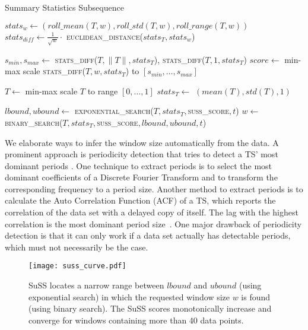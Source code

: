 \documentclass[pdflatex,sn-basic]{sn-jnl}
\begin{document}
\begin{algorithm}[t]
	\caption{Summary Statistics Subsequence}\label{alg:suss}
	\begin{algorithmic}[1]
			\State $stats_w \gets (roll\_mean(T, w), roll\_std(T, w), roll\_range(T,w))$
		    \State $stats_{diff} \gets \frac{1}{\sqrt{w}} \cdot $ \textsc{euclidean\_distance}($stats_T, stats_w$)
		    \State {}
		\EndProcedure
		
			\State $s_{min}, s_{max} \gets $ \textsc{stats\_diff($T, \|T\|, stats_T$)}, \textsc{stats\_diff($T, 1, stats_T$)}
			\State $score \gets $ min-max scale \textsc{stats\_diff($T, w, stats_T$)} to $[s_{min},\dots,s_{max}]$
			\State {}
		\EndProcedure
		
			\State $T \gets $ min-max scale $T$ to range $[0,\dots,1]$
			\State $stats_T  \gets $ $(mean(T), std(T), 1)$
			
			\State $lbound, ubound \gets $ \textsc{exponential\_search($T, stats_T,$\textsc{suss\_score}$,t$)}
			\State $w \gets $ \textsc{binary\_search}($T, stats_T,$\textsc{suss\_score}$,lbound, ubound, t$)
			\State {}
		\EndProcedure
	\end{algorithmic}
\end{algorithm}

We elaborate ways to infer the window size automatically from the data. A prominent approach is periodicity detection that tries to detect a TS' most dominant periods \citep{Elfeky2005PeriodicityDI}. One technique to extract periods is to select the most dominant coefficients of a Discrete Fourier Transform and to transform the corresponding frequency to a period size. Another method to extract periods is to calculate the Auto Correlation Function (ACF) of a TS, which reports the correlation of the data set with a delayed copy of itself. The lag with the highest correlation is the most dominant period size~\citep{Vlachos2005OnPD, Wen2021RobustPeriodRT}. One major drawback of periodicity detection is that it can only work if a data set actually has detectable periods, which must not necessarily be the case.

\begin{figure}[t]
	\texttt{[image: suss\_curve.pdf]}
	\caption{SuSS locates a narrow range between $lbound$ and $ubound$ (using exponential search) in which the requested window size $w$ is found (using binary search). The SuSS scores  monotonically increase and converge for windows containing more than 40 data points. \label{fig:SuSS_curve}
	}
\end{figure}
\end{document}
